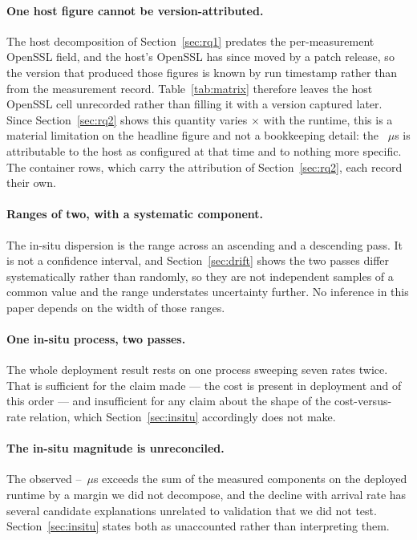 \documentclass[pdflatex,sn-basic,twocolumn]{sn-jnl}%
\begin{document}
\paragraph{One host figure cannot be version-attributed.} The host decomposition
of Section~\ref{sec:rq1} predates the per-measurement OpenSSL field, and the
host's OpenSSL has since moved by a patch release, so the version that produced
those figures is known by run timestamp rather than from the measurement record.
Table~\ref{tab:matrix} therefore leaves the host OpenSSL cell unrecorded rather
than filling it with a version captured later. Since Section~\ref{sec:rq2} shows
this quantity varies \SpanProbeThrows$\times$ with the runtime, this is a
material limitation on the headline figure and not a bookkeeping detail: the
\HostProbeThrows~$\mu$s is attributable to the host as configured at that time
and to nothing more specific. The container rows, which carry the attribution of
Section~\ref{sec:rq2}, each record their own.

\paragraph{Ranges of two, with a systematic component.} The in-situ dispersion is
the range across an ascending and a descending pass. It is not a confidence
interval, and Section~\ref{sec:drift} shows the two passes differ systematically
rather than randomly, so they are not independent samples of a common value and
the range understates uncertainty further. No inference in this paper depends on
the width of those ranges.

\paragraph{One in-situ process, two passes.} The whole deployment result rests on
one process sweeping seven rates twice. That is sufficient for the claim made ---
the cost is present in deployment and of this order --- and insufficient for any
claim about the shape of the cost-versus-rate relation, which
Section~\ref{sec:insitu} accordingly does not make.

\paragraph{The in-situ magnitude is unreconciled.} The observed
\InsituObservedLo--\InsituObservedHi~$\mu$s exceeds the sum of the measured
components on the deployed runtime by a margin we did not decompose, and the
decline with arrival rate has several candidate explanations unrelated to
validation that we did not test. Section~\ref{sec:insitu} states both as
unaccounted rather than interpreting them.
\end{document}
